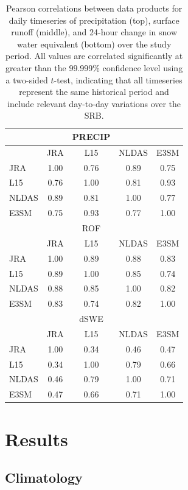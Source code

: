 \documentclass[nhess, manuscript]{copernicus}
\begin{document}
\begin{table}[]
\caption{Pearson correlations between data products for daily timeseries of precipitation (top), surface runoff (middle), and 24-hour change in snow water equivalent (bottom) over the study period. All values are correlated significantly at greater than the 99.999\% confidence level using a two-sided $t$-test, indicating that all timeseries represent the same historical period and include relevant day-to-day variations over the SRB.}
\begin{tabular}{lcccc}
 \hline
      &      & PRECIP &       &       \\ \hline 
      & JRA  & L15    & NLDAS & E3SM \\
JRA   & 1.00 & 0.76   & 0.89  & 0.75 \\
L15   & 0.76 & 1.00   & 0.81  & 0.93 \\
NLDAS & 0.89 & 0.81   & 1.00  & 0.77 \\
E3SM  & 0.75 & 0.93   & 0.77  & 1.00  \\ \hline \hline
      &      & ROF    &       &      \\ \hline 
      & JRA  & L15    & NLDAS & E3SM \\
JRA   & 1.00 & 0.89   & 0.88  & 0.83 \\
L15   & 0.89 & 1.00   & 0.85  & 0.74 \\
NLDAS & 0.88 & 0.85   & 1.00  & 0.82 \\
E3SM  & 0.83 & 0.74   & 0.82  & 1.00 \\ \hline \hline
      &      & dSWE   &       &      \\ \hline 
      & JRA  & L15    & NLDAS & E3SM \\
JRA   & 1.00 & 0.34   & 0.46  & 0.47 \\
L15   & 0.34 & 1.00   & 0.79  & 0.66 \\
NLDAS & 0.46 & 0.79   & 1.00  & 0.71 \\
E3SM  & 0.47 & 0.66   & 0.71  & 1.00 \\ \hline \hline
\end{tabular}
\label{table:correlations}
\end{table}

\section{Results}

\subsection{Climatology}
\end{document}
